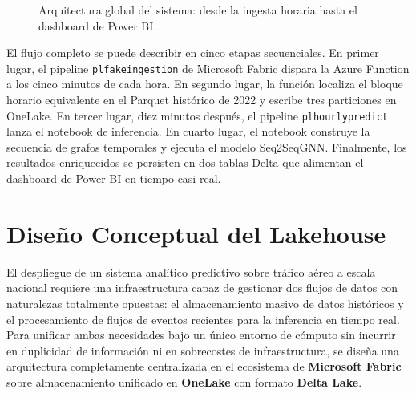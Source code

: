\documentclass[12pt,oneside,a4paper]{report}
\renewcommand{\_}{\textunderscore\allowbreak}
\begin{document}
\begin{figure}[h!]
\caption{Arquitectura global del sistema: desde la ingesta horaria hasta el dashboard de Power BI.}
\label{fig:arquitectura_global}
\end{figure}

El flujo completo se puede describir en cinco etapas secuenciales. En primer lugar, el pipeline \texttt{pl\_fake\_ingestion} de Microsoft Fabric dispara la Azure Function a los cinco minutos de cada hora. En segundo lugar, la función localiza el bloque horario equivalente en el Parquet histórico de 2022 y escribe tres particiones en OneLake. En tercer lugar, diez minutos después, el pipeline \texttt{pl\_hourly\_predict} lanza el notebook de inferencia. En cuarto lugar, el notebook construye la secuencia de grafos temporales y ejecuta el modelo Seq2SeqGNN. Finalmente, los resultados enriquecidos se persisten en dos tablas Delta que alimentan el dashboard de Power BI en tiempo casi real.

\section{Diseño Conceptual del Lakehouse}
\label{sec:diseno_conceptual}

El despliegue de un sistema analítico predictivo sobre tráfico aéreo a escala nacional requiere una infraestructura capaz de gestionar dos flujos de datos con naturalezas totalmente opuestas: el almacenamiento masivo de datos históricos y el procesamiento de flujos de eventos recientes para la inferencia en tiempo real. Para unificar ambas necesidades bajo un único entorno de cómputo sin incurrir en duplicidad de información ni en sobrecostes de infraestructura, se diseña una arquitectura completamente centralizada en el ecosistema de \textbf{Microsoft Fabric} sobre almacenamiento unificado en \textbf{OneLake} con formato \textbf{Delta Lake}.
\end{document}
